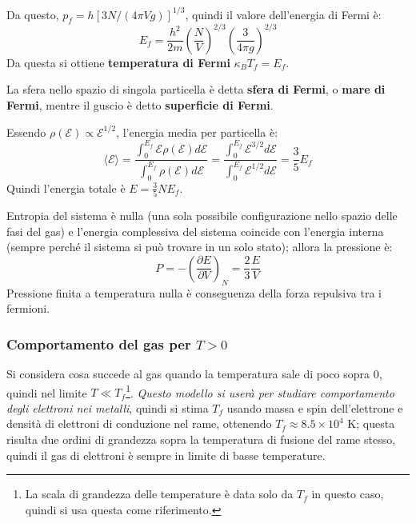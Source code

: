 \documentclass[10pt, a4paper]{scrartcl}
\numberwithin{equation}{subsection}
\theoremstyle{style1}
\theoremstyle{style2}
\begin{document}
Da questo, $p_f = h [3N / (4\pi V g)] ^{1 / 3}$, quindi il valore dell'energia di Fermi \`e:
\begin{equation}
	E_f = \frac{h^2}{2m} \left(\frac{N}{V}\right) ^{2/3} \left(\frac{3}{4\pi g} \right) ^{2 /3 }
\end{equation}
Da questa si ottiene \textbf{temperatura di Fermi} $\kappa _B T_f = E_f$. 

La sfera nello spazio di singola particella \`e detta \textbf{sfera di Fermi}, o \textbf{mare di Fermi}, mentre il guscio \`e detto \textbf{superficie di Fermi}.

Essendo $\rho (\mathscr{E}) \propto \mathscr{E}^{1 / 2} $, l'energia media per particella è:
\begin{equation}
	\langle \mathscr{E} \rangle = \frac{\displaystyle \int_{0} ^{E_f} \mathscr{E}\rho (\mathscr{E}) d \mathscr{E}}{\displaystyle \int_{0} ^{E_f} \rho (\mathscr{E}) d\mathscr{E}} = \frac{ \displaystyle \int_{0} ^{E_f} \mathscr{E}^{3 / 2}  d \mathscr{E}}{\displaystyle  \int_{0} ^{E_f} \mathscr{E}^{1 / 2}  d \mathscr{E}}= \frac{3}{5} E_f
\end{equation}
Quindi l'energia totale \`e $E = \frac{3}{5} N E_f$. 

Entropia del sistema \`e nulla (una sola possibile configurazione nello spazio delle fasi del gas) e l'energia complessiva del sistema coincide con l'energia interna (sempre perché il sistema si pu\`o trovare in un solo stato); allora la pressione \`e:
\begin{equation}\label{Pf}
P = - \left(\frac{\partial E}{\partial V} \right) _N = \frac{2}{3} \frac{E}{V}
\end{equation}
Pressione finita a temperatura nulla \`e conseguenza della forza repulsiva tra i fermioni.	
\subsubsection{Comportamento del gas per $T>0$}
Si considera cosa succede al gas quando la temperatura sale di poco sopra $0$, quindi nel limite $T \ll T_f$\footnote{La scala di grandezza delle temperature \`e data solo da $T_f$ in questo caso, quindi si usa questa come riferimento.}. \textit{Questo modello si user\`a per studiare comportamento degli elettroni nei metalli}, quindi si stima $T_f$ usando massa e spin dell'elettrone e densit\`a di elettroni di conduzione nel rame, ottenendo $T_f \approx 8.5 \times 10^4$ K; questa risulta due ordini di grandezza sopra la temperatura di fusione del rame stesso, quindi il gas di elettroni \`e sempre in limite di basse temperature.
\end{document}
